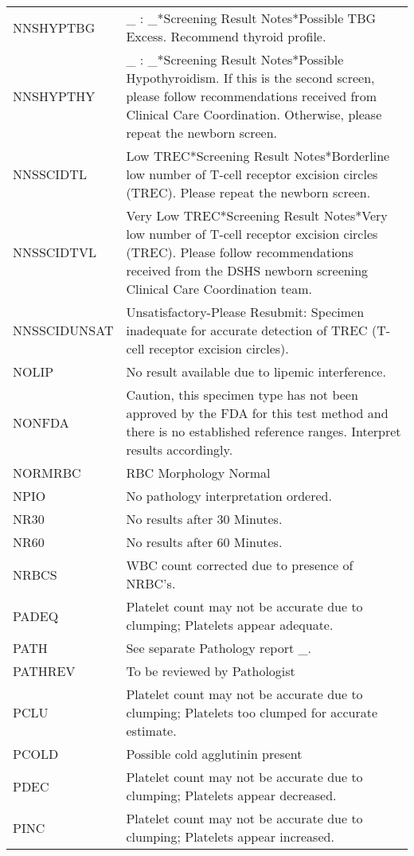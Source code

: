 \begin{fullwidth}
\begin{longtable}{p{.20\linewidth} p{.75\linewidth}}
NNSHYPTBG    & \_ : \_*Screening Result Notes*Possible TBG Excess. Recommend thyroid profile.\\
NNSHYPTHY    & \_ : \_*Screening Result Notes*Possible Hypothyroidism. If this is the second screen, please follow recommendations received from Clinical Care Coordination. Otherwise, please repeat the newborn screen.\\
NNSSCIDTL    & Low TREC*Screening Result Notes*Borderline low number of T-cell receptor excision circles (TREC). Please repeat the newborn screen.\\
NNSSCIDTVL   & Very Low TREC*Screening Result Notes*Very low number of T-cell receptor excision circles (TREC). Please follow recommendations received from the DSHS newborn screening Clinical Care Coordination team.\\
NNSSCIDUNSAT & Unsatisfactory-Please Resubmit: Specimen inadequate for accurate detection of TREC (T-cell receptor excision circles).\\
NOLIP        & No result available due to lipemic interference.\\
NONFDA       & Caution, this specimen type has not been approved by the FDA for this test method and there is no established reference ranges. Interpret results accordingly.\\
NORMRBC      & RBC Morphology Normal\\
NPIO         & No pathology interpretation ordered.\\
NR30         & No results after 30 Minutes.\\
NR60         & No results after 60 Minutes.\\
NRBCS        & WBC count corrected due to presence of NRBC's.\\
PADEQ        & Platelet count may not be accurate due to clumping; Platelets appear adequate.\\
PATH         & See separate Pathology report \_.\\
PATHREV      & To be reviewed by Pathologist\\
PCLU         & Platelet count may not be accurate due to clumping; Platelets too clumped for accurate estimate.\\
PCOLD        & Possible cold agglutinin present\\
PDEC         & Platelet count may not be accurate due to clumping; Platelets appear decreased.\\
PINC         & Platelet count may not be accurate due to clumping; Platelets appear increased.\\

\end{longtable}
\end{fullwidth}
